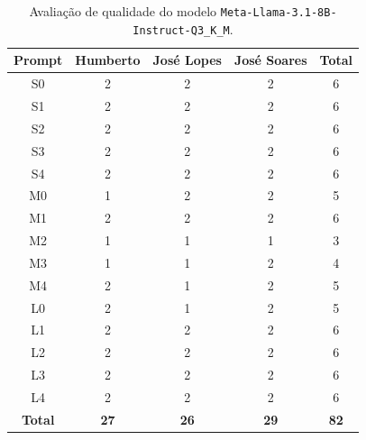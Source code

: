 \begin{table}[H]
    \centering
    \begin{tabular}{|c|c|c|c|c|}
        \hline
        \textbf{Prompt}      &
        \textbf{Humberto}    &
        \textbf{José Lopes}  &
        \textbf{José Soares} &
        \textbf{Total}       \\ \hline

        S0 & 2 & 2 & 2 & 6 \\ \hline
        S1 & 2 & 2 & 2 & 6 \\ \hline
        S2 & 2 & 2 & 2 & 6 \\ \hline
        S3 & 2 & 2 & 2 & 6 \\ \hline
        S4 & 2 & 2 & 2 & 6 \\ \hline
        M0 & 1 & 2 & 2 & 5 \\ \hline
        M1 & 2 & 2 & 2 & 6 \\ \hline
        M2 & 1 & 1 & 1 & 3 \\ \hline
        M3 & 1 & 1 & 2 & 4 \\ \hline
        M4 & 2 & 1 & 2 & 5 \\ \hline
        L0 & 2 & 1 & 2 & 5 \\ \hline
        L1 & 2 & 2 & 2 & 6 \\ \hline
        L2 & 2 & 2 & 2 & 6 \\ \hline
        L3 & 2 & 2 & 2 & 6 \\ \hline
        L4 & 2 & 2 & 2 & 6 \\ \hline

        \textbf{Total} & \textbf{27} & \textbf{26} & \textbf{29} & \textbf{82} \\ \hline
    \end{tabular}
    \caption{Avaliação de qualidade do modelo \texttt{Meta-Llama-3.1-8B-Instruct-Q3\_K\_M}.}
\end{table}

